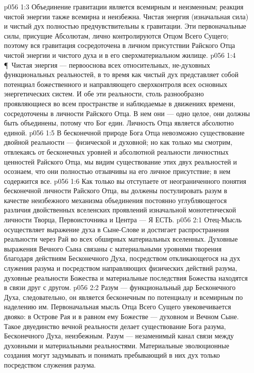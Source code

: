 \vs p056 1:3 Объединение гравитации является всемирным и неизменным; реакция чистой энергии также всемирна и неизбежна. Чистая энергия (изначальная сила) и чистый дух полностью предчувствительны к гравитации. Эти первоначальные силы, присущие Абсолютам, лично контролируются Отцом Всего Сущего; поэтому вся гравитация сосредоточена в личном присутствии Райского Отца чистой энергии и чистого духа и в его сверхматериальном жилище.
\vs p056 1:4 \P\ Чистая энергия --- первооснова всех относительных, не\hyp{}духовных функциональных реальностей, в то время как чистый дух представляет собой потенциал божественного и направляющего сверхконтроля всех основных энергетических систем. И обе эти реальности, столь разнообразно проявляющиеся во всем пространстве и наблюдаемые в движениях времени, сосредоточены в личности Райского Отца. В нем они --- одно целое, они должны быть объединены, потому что Бог един. Личность Отца является абсолютно единой.
\vs p056 1:5 В бесконечной природе Бога Отца невозможно существование двойной реальности --- физической и духовной; но как только мы смотрим, отвлекаясь от бесконечных уровней и абсолютной реальности личностных ценностей Райского Отца, мы видим существование этих двух реальностей и осознаем, что они полностью отзывчивы на его личное присутствие; в нем содержится все.
\vs p056 1:6 Как только вы отступаете от неограниченного понятия бесконечной личности Райского Отца, вы должены постулировать разум в качестве неизбежного механизма объединения постоянно углубляющегося различия двойственных вселенских проявлений изначальной монотетической личности Творца, Первоисточника и Центра --- Я ЕСТЬ.
\vs p056 2:1 Отец\hyp{}Мысль осуществляет выражение духа в Сыне\hyp{}Слове и достигает распространения реальности через Рай во всех обширных материальных вселенных. Духовные выражения Вечного Сына связаны с материальными уровнями творения благодаря действиям Бесконечного Духа, посредством откликающегося на дух служения разума и посредством направляющих физических действий разума, духовные реальности Божества и материальные последствия Божества находятся в связи друг с другом.
\vs p056 2:2 Разум --- функциональный дар Бесконечного Духа, следовательно, он является бесконечным по потенциалу и всемирным по наделению им. Первоначальная мысль Отца Всего Сущего увековечивается двояко: в Острове Рая и в равном ему Божестве --- духовном и Вечном Сыне. Такое двуединство вечной реальности делает существование Бога разума, Бесконечного Духа, неизбежным. Разум --- незаменимый канал связи между духовными и материальными реальностями. Материальные эволюционные создания могут задумывать и понимать пребывающий в них дух только посредством служения разума.
